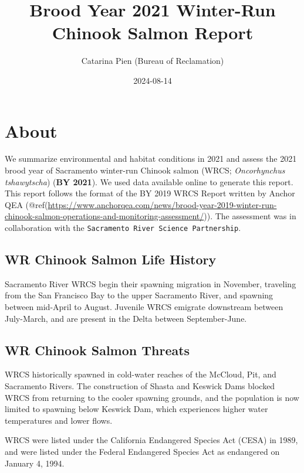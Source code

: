 \documentclass[
]{book}
\title{Brood Year 2021 Winter-Run Chinook Salmon Report}
\author{Catarina Pien (Bureau of Reclamation)}
\date{2024-08-14}
\theoremstyle{definition}
\theoremstyle{definition}
\theoremstyle{definition}
\theoremstyle{definition}
\theoremstyle{remark}
\begin{document}
\maketitle

{
\setcounter{tocdepth}{1}
\tableofcontents
}
\hypertarget{about}{%
\chapter{About}\label{about}}

We summarize environmental and habitat conditions in 2021 and assess the 2021 brood year of Sacramento winter-run Chinook salmon (WRCS; \emph{Oncorhynchus tshawytscha}) (\textbf{BY 2021}). We used data available online to generate this report. This report follows the format of the BY 2019 WRCS Report written by Anchor QEA (@ref(\url{https://www.anchorqea.com/news/brood-year-2019-winter-run-chinook-salmon-operations-and-monitoring-assessment/})). The assessment was in collaboration with the \texttt{Sacramento\ River\ Science\ Partnership}.

\hypertarget{wr-chinook-salmon-life-history}{%
\section{WR Chinook Salmon Life History}\label{wr-chinook-salmon-life-history}}

Sacramento River WRCS begin their spawning migration in November, traveling from the San Francisco Bay to the upper Sacramento River, and spawning between mid-April to August. Juvenile WRCS emigrate downstream between July-March, and are present in the Delta between September-June.

\hypertarget{wr-chinook-salmon-threats}{%
\section{WR Chinook Salmon Threats}\label{wr-chinook-salmon-threats}}

WRCS historically spawned in cold-water reaches of the McCloud, Pit, and Sacramento Rivers. The construction of Shasta and Keswick Dams blocked WRCS from returning to the cooler spawning grounds, and the population is now limited to spawning below Keswick Dam, which experiences higher water temperatures and lower flows.

WRCS were listed under the California Endangered Species Act (CESA) in 1989, and were listed under the Federal Endangered Species Act as endangered on January 4, 1994.
\end{document}
